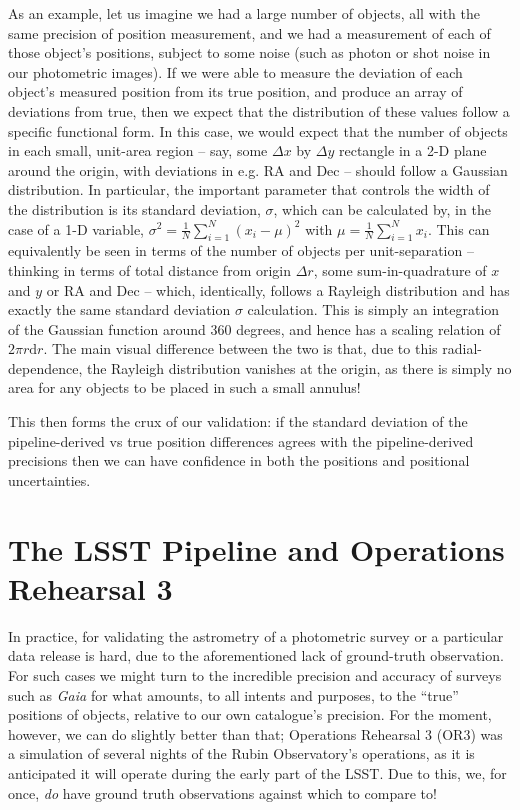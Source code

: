 \documentclass[SE,lsstdraft,authoryear,toc]{lsstdoc}
\begin{document}
As an example, let us imagine we had a large number of objects, all with the same precision of position measurement, and we had a measurement of each of those object's positions, subject to some noise (such as photon or shot noise in our photometric images).
If we were able to measure the deviation of each object's measured position from its true position, and produce an array of deviations from true, then we expect that the distribution of these values follow a specific functional form.
In this case, we would expect that the number of objects in each small, unit-area region -- say, some $\Delta x$ by $\Delta y$ rectangle in a 2-D plane around the origin, with deviations in e.g. RA and Dec -- should follow a Gaussian distribution.
In particular, the important parameter that controls the width of the distribution is its standard deviation, $\sigma$, which can be calculated by, in the case of a 1-D variable, $\sigma^2 = \frac{1}{N} \sum_{i=1}^N(x_i - \mu)^2$ with $\mu = \frac{1}{N}\sum_{i=1}^Nx_i$.
This can equivalently be seen in terms of the number of objects per unit-separation -- thinking in terms of total distance from origin $\Delta r$, some sum-in-quadrature of $x$ and $y$ or RA and Dec -- which, identically, follows a Rayleigh distribution and has exactly the same standard deviation $\sigma$ calculation.
This is simply an integration of the Gaussian function around 360 degrees, and hence has a scaling relation of $2\pi r \mathrm{d}r$.
The main visual difference between the two is that, due to this radial-dependence, the Rayleigh distribution vanishes at the origin, as there is simply no area for any objects to be placed in such a small annulus!

This then forms the crux of our validation: if the standard deviation of the pipeline-derived vs true position differences agrees with the pipeline-derived precisions then we can have confidence in both the positions and positional uncertainties.

\section{The LSST Pipeline and Operations Rehearsal 3}
In practice, for validating the astrometry of a photometric survey or a particular data release is hard, due to the aforementioned lack of ground-truth observation.
For such cases we might turn to the incredible precision and accuracy of surveys such as \textit{Gaia} \citep{Collaboration2021} for what amounts, to all intents and purposes, to the ``true'' positions of objects, relative to our own catalogue's precision.
For the moment, however, we can do slightly better than that; Operations Rehearsal 3 (OR3) was a simulation of several nights of the Rubin Observatory's operations, as it is anticipated it will operate during the early part of the LSST.
Due to this, we, for once, \textit{do} have ground truth observations against which to compare to!
\end{document}
